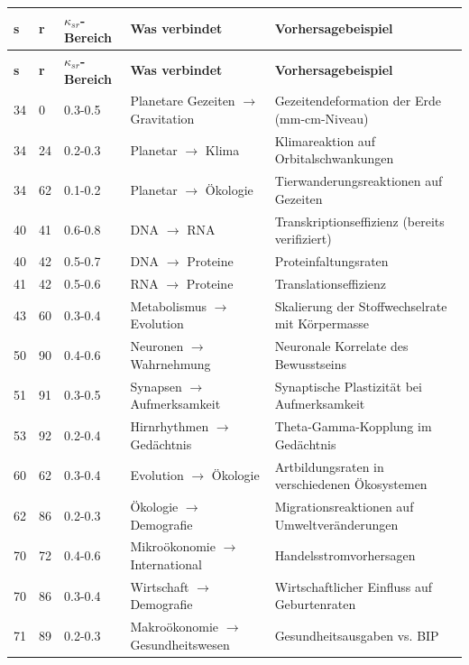 \documentclass[13pt,a4paper]{article}
\begin{document}
	\begin{longtable}{|p{1cm}|p{1cm}|p{2.5cm}|p{4cm}|p{3cm}|}
		\hline
		\textbf{s} & \textbf{r} & \textbf{$\kappa_{sr}$-Bereich} & \textbf{Was verbindet} & \textbf{Vorhersagebeispiel} \\
		\hline
		\endfirsthead
		\hline
		\textbf{s} & \textbf{r} & \textbf{$\kappa_{sr}$-Bereich} & \textbf{Was verbindet} & \textbf{Vorhersagebeispiel} \\
		\hline
		\endhead
		
		34 & 0 & 0.3-0.5 & Planetare Gezeiten $\rightarrow$ Gravitation & Gezeitendeformation der Erde (mm-cm-Niveau) \\
		34 & 24 & 0.2-0.3 & Planetar $\rightarrow$ Klima & Klimareaktion auf Orbitalschwankungen \\
		34 & 62 & 0.1-0.2 & Planetar $\rightarrow$ Ökologie & Tierwanderungsreaktionen auf Gezeiten \\
		40 & 41 & 0.6-0.8 & DNA $\rightarrow$ RNA & Transkriptionseffizienz (bereits verifiziert) \\
		40 & 42 & 0.5-0.7 & DNA $\rightarrow$ Proteine & Proteinfaltungsraten \\
		41 & 42 & 0.5-0.6 & RNA $\rightarrow$ Proteine & Translationseffizienz \\
		43 & 60 & 0.3-0.4 & Metabolismus $\rightarrow$ Evolution & Skalierung der Stoffwechselrate mit Körpermasse \\
		50 & 90 & 0.4-0.6 & Neuronen $\rightarrow$ Wahrnehmung & Neuronale Korrelate des Bewusstseins \\
		51 & 91 & 0.3-0.5 & Synapsen $\rightarrow$ Aufmerksamkeit & Synaptische Plastizität bei Aufmerksamkeit \\
		53 & 92 & 0.2-0.4 & Hirnrhythmen $\rightarrow$ Gedächtnis & Theta-Gamma-Kopplung im Gedächtnis \\
		60 & 62 & 0.3-0.4 & Evolution $\rightarrow$ Ökologie & Artbildungsraten in verschiedenen Ökosystemen \\
		62 & 86 & 0.2-0.3 & Ökologie $\rightarrow$ Demografie & Migrationsreaktionen auf Umweltveränderungen \\
		70 & 72 & 0.4-0.6 & Mikroökonomie $\rightarrow$ International & Handelsstromvorhersagen \\
		70 & 86 & 0.3-0.4 & Wirtschaft $\rightarrow$ Demografie & Wirtschaftlicher Einfluss auf Geburtenraten \\
		71 & 89 & 0.2-0.3 & Makroökonomie $\rightarrow$ Gesundheitswesen & Gesundheitsausgaben vs. BIP \\

\end{longtable}
\end{document}

